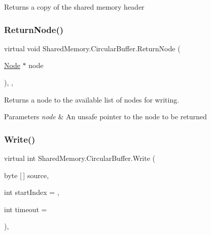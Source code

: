 Returns a copy of the shared memory header 

\mbox{\label{class_shared_memory_1_1_circular_buffer_ae7b68568186c9e2324d36990b3f2e101}} 
\subsubsection{\texorpdfstring{Return\+Node()}{ReturnNode()}}
{\footnotesize\ttfamily virtual void Shared\+Memory.\+Circular\+Buffer.\+Return\+Node (\begin{DoxyParamCaption}\item[{\hyperlink{struct_shared_memory_1_1_circular_buffer_1_1_node}{Node} $\ast$}]{node }\end{DoxyParamCaption})\hspace{0.3cm}{\ttfamily [inline]}, {\ttfamily [protected]}, {\ttfamily [virtual]}}



Returns a node to the available list of nodes for writing. 


\begin{DoxyParams}{Parameters}
{\em node} & An unsafe pointer to the node to be returned\\
\hline
\end{DoxyParams}
\mbox{\label{class_shared_memory_1_1_circular_buffer_a988b37e45afb8a8576041ed350407a0a}} 
\subsubsection{\texorpdfstring{Write()}{Write()}\hspace{0.1cm}{\footnotesize\ttfamily [1/3]}}
{\footnotesize\ttfamily virtual int Shared\+Memory.\+Circular\+Buffer.\+Write (\begin{DoxyParamCaption}\item[{byte \mbox{[}$\,$\mbox{]}}]{source,  }\item[{int}]{start\+Index = {},  }\item[{int}]{timeout = {} }\end{DoxyParamCaption})\hspace{0.3cm}{\ttfamily [inline]}, {\ttfamily [virtual]}}



